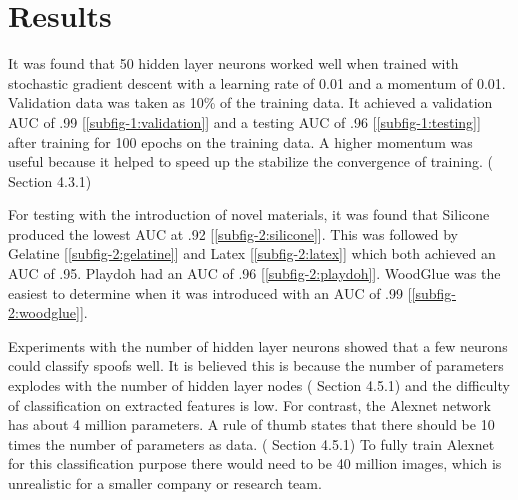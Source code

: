 \documentclass[]{article}
\begin{document}
\section{Results}
It was found that 50 hidden layer neurons worked well when trained with stochastic gradient descent with a learning rate of 0.01 and a momentum of 0.01. Validation data was taken as 10\% of the training data. It achieved a validation AUC of .99 [\ref{subfig-1:validation}] and a testing AUC of .96 [\ref{subfig-1:testing}] after training for 100 epochs on the training data. A higher momentum was useful because it helped to speed up the stabilize the convergence of training. (\cite{book} Section 4.3.1)  

For testing with the introduction of novel materials, it was found that Silicone produced the lowest AUC at .92 [\ref{subfig-2:silicone}]. This was followed by Gelatine [\ref{subfig-2:gelatine}] and Latex [\ref{subfig-2:latex}] which both achieved an AUC of .95. Playdoh had an AUC of .96 [\ref{subfig-2:playdoh}]. WoodGlue was the easiest to determine when it was introduced with an AUC of .99 [\ref{subfig-2:woodglue}].

Experiments with the number of hidden layer neurons showed that a few neurons could classify spoofs well. It is believed this is because the number of parameters explodes with the number of hidden layer nodes (\cite{book} Section 4.5.1) and the difficulty of classification on extracted features is low. For contrast, the Alexnet network has about 4 million parameters. A rule of thumb states that there should be 10 times the number of parameters as data. (\cite{book} Section 4.5.1) To fully train Alexnet for this classification purpose there would need to be 40 million images, which is unrealistic for a smaller company or research team. 
\end{document}
